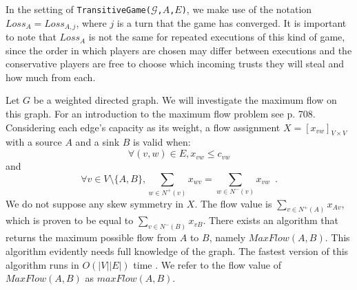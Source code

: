 \documentclass[11pt]{llncs}
\theoremstyle{definition}
\begin{document}
    In the setting of \texttt{TransitiveGame(}$\mathcal{G}$\texttt{,}$A$\texttt{,}$E$\texttt{)}, we make use of the notation
    $Loss_A = Loss_{A, j}$, where $j$ is a turn that the game has converged. It is important to note that $Loss_A$ is
    not the same for repeated executions of this kind of game, since the order in which players are chosen may differ between
    executions and the conservative players are free to choose which incoming trusts they will steal and how much from each.

    Let $G$ be a weighted directed graph. We will investigate the maximum flow on this graph. For an introduction to the
    maximum flow problem see \cite{clrs} p. 708. Considering each edge's capacity as its weight, a flow assignment
    $X = [x_{vw}]_{V \times V}$ with a source $A$ and a sink $B$ is valid when:
    \begin{equation}
    \label{flow1}
       \forall (v, w) \in E, x_{vw} \leq c_{vw}
    \end{equation}
    and
    \begin{equation}
    \label{flow2}
       \forall v \in V \setminus \{A,B\}, \sum\limits_{w \in N^{+}(v)}x_{wv} = \sum\limits_{w \in N^{-}(v)}x_{vw}
       \enspace.
    \end{equation}
    We do not suppose any skew symmetry in $X$. The flow value is $\sum\limits_{v \in N^{+}\left(A\right)}x_{Av}$, which is
    proven to be equal to $\sum\limits_{v \in N^{-}\left(B\right)}x_{vB}$. There exists an algorithm that returns the maximum
    possible flow from $A$ to $B$, namely $MaxFlow\left(A, B\right)$. This algorithm evidently needs full knowledge of the
    graph. The fastest version of this algorithm runs in $O\left(|V||E|\right)$ time \cite{maxflownm}. We refer to the flow
    value of $MaxFlow\left(A, B\right)$ as $maxFlow\left(A, B\right)$.
\end{document}
